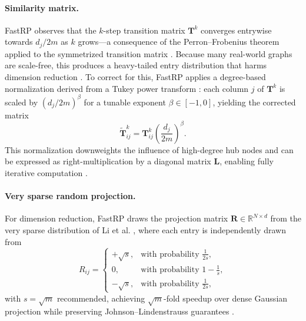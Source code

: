 \documentclass[conference]{IEEEtran}
\begin{document}
\paragraph{Similarity matrix.}
FastRP \cite{chen2019fast} observes that the $k$-step transition matrix
$\mathbf{T}^k$ converges entrywise towards $d_j / 2m$ as $k$ grows---a
consequence of the Perron--Frobenius theorem applied to the symmetrized
transition matrix \cite{chen2019fast}. Because many real-world graphs are
scale-free, this produces a heavy-tailed entry distribution that harms
dimension reduction \cite{chen2019fast}. To correct for this, FastRP
\cite{chen2019fast} applies a degree-based normalization derived from a
Tukey power transform \cite{tukey1957}: each column $j$ of $\mathbf{T}^k$
is scaled by $(d_j / 2m)^{\beta}$ for a tunable exponent $\beta \in [-1, 0]$,
yielding the corrected matrix
\begin{equation}
    \widetilde{\mathbf{T}}^k_{ij}
        = \mathbf{T}^k_{ij} \left(\frac{d_j}{2m}\right)^{\beta}.
    \label{eq:fastrp-norm}
\end{equation}
This normalization downweights the influence of high-degree hub nodes and
can be expressed as right-multiplication by a diagonal matrix $\mathbf{L}$,
enabling fully iterative computation \cite{chen2019fast}.

\paragraph{Very sparse random projection.}
For dimension reduction, FastRP \cite{chen2019fast} draws the projection
matrix $\mathbf{R} \in \mathbb{R}^{N \times d}$ from the very sparse
distribution of Li et al. \cite{li2006very}, where each
entry is independently drawn from
\begin{equation}
    R_{ij} = \begin{cases}
        +\!\sqrt{s}, & \text{with probability } \tfrac{1}{2s},\\
        0,           & \text{with probability } 1 - \tfrac{1}{s},\\
        -\!\sqrt{s}, & \text{with probability } \tfrac{1}{2s},
    \end{cases}
    \label{eq:very-sparse}
\end{equation}
with $s = \sqrt{m}$ recommended, achieving $\sqrt{m}$-fold speedup over
dense Gaussian projection while preserving Johnson--Lindenstrauss
guarantees \cite{dasgupta1999,li2006very}.
\end{document}
